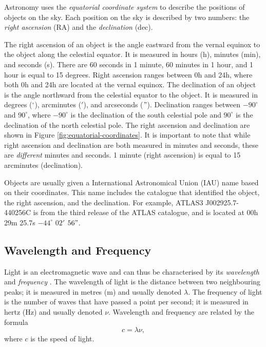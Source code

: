             Astronomy uses the \emph{equatorial coordinate system} to describe
            the positions of objects on the sky. Each position on the sky is
            described by two numbers: the \emph{right ascension} (RA) and the
            \emph{declination} (dec).

            The right ascension of an object is the angle eastward from the
            vernal equinox to the object along the celestial equator. It is
            measured in hours (h), minutes (min), and seconds (s). There are 60
            seconds in 1 minute, 60 minutes in 1 hour, and 1 hour is equal to 15
            degrees. Right ascension ranges between 0h and 24h, where both 0h
            and 24h are located at the vernal equinox. The declination of an
            object is the angle northward from the celestial equator to the
            object. It is measured in degrees (${}^\circ$), arcminutes ($'$),
            and arcseconds ($"$). Declination ranges between $-90^\circ$ and
            $90^\circ$, where $-90^\circ$ is the declination of the south
            celestial pole and $90^\circ$ is the declination of the north
            celestial pole. The right ascension and declination are shown in
            Figure \ref{fig:equatorial-coordinates}. It is important to note
            that while right ascension and declination are both measured in
            minutes and seconds, these are \emph{different} minutes and seconds.
            1 minute (right ascension) is equal to 15 arcminutes (declination).

            Objects are usually given a International Astronomical Union (IAU)
            name based on their coordinates. This name includes the catalogue
            that identified the object, the right ascension, and the
            declination. For example, ATLAS3 J002925.7-440256C is from the third
            release of the ATLAS catalogue, and is located at 00h 29m 25.7s
            $-44^\circ$ $02'$ $56"$.

        \subsection{Wavelength and Frequency}
        \label{sec:wavelength}

            Light is an electromagnetic wave and can thus be characterised by
            its \emph{wavelength} and \emph{frequency} \citep{griffiths99}. The
            wavelength of light is the distance between two neighbouring peaks;
            it is measured in metres (m) and usually denoted $\lambda$. The
            frequency of light is the number of waves that have passed a point
            per second; it is measured in hertz (Hz) and usually denoted $\nu$.
            Wavelength and frequency are related by the formula
            \[
                c = \lambda \nu,
            \]
            where $c$ is the speed of light.

